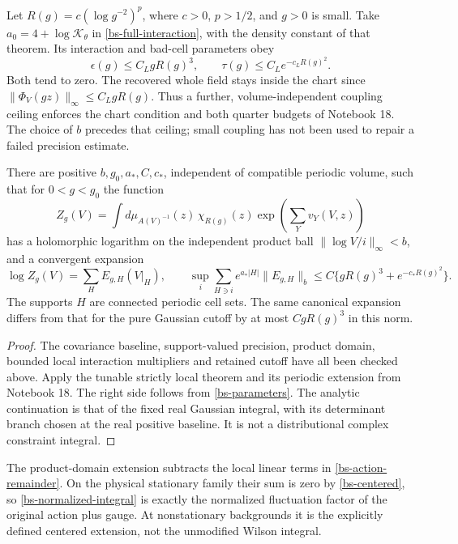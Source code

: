 Let $R(g)=c(\log g^{-2})^p$, where $c>0$, $p>1/2$,
and $g>0$ is small. Take $a_0=4+\log\mathcal K_\theta$
in \eqref{bs-full-interaction}, with the density constant of
that theorem. Its interaction and bad-cell parameters obey
\begin{equation}\label{bs-parameters}
 \epsilon(g)\le C_LgR(g)^3,\qquad
 \tau(g)\le C_L e^{-c_LR(g)^2}.
\end{equation}
Both tend to zero. The recovered whole field stays inside
the chart since $\|\Phi_V(gz)\|_\infty\le C_LgR(g)$.
Thus a further, volume-independent coupling ceiling enforces
the chart condition and both quarter budgets of Notebook 18.
The choice of $b$ precedes that ceiling; small coupling has
not been used to repair a failed precision estimate.

\begin{theorem}
\label{bs-theorem}
There are positive $b,g_0,a_*,C,c_*$, independent of compatible
periodic volume, such that for $0<g<g_0$ the function
\begin{equation}\label{bs-normalized-integral}
 Z_g(V)=\int d\mu_{A(V)^{-1}}(z)\,
                  \chi_{R(g)}(z)\exp\!\left(\sum_Y v_Y(V,z)\right)
\end{equation}
has a holomorphic logarithm on the independent product ball
$\|\log V/i\|_\infty<b$, and a convergent expansion
\begin{equation}\label{bs-local-log}
 \log Z_g(V)=\sum_H E_{g,H}(V|_H),\qquad
 \sup_i\sum_{H\ni i}e^{a_*|H|}\|E_{g,H}\|_b
 \le C\{gR(g)^3+e^{-c_*R(g)^2}\}.
\end{equation}
The supports $H$ are connected periodic cell sets. The same
canonical expansion differs from that for the pure Gaussian
cutoff by at most $CgR(g)^3$ in this norm.
\end{theorem}
\begin{proof}
The covariance baseline, support-valued precision, product
domain, bounded local interaction multipliers and retained
cutoff have all been checked above. Apply the tunable strictly
local theorem and its periodic extension from Notebook 18.
The right side follows from \eqref{bs-parameters}. The
analytic continuation is that of the fixed real Gaussian
integral, with its determinant branch chosen at the real
positive baseline. It is not a distributional complex
constraint integral.
\end{proof}

The product-domain extension subtracts the local linear
terms in \eqref{bs-action-remainder}. On the physical
stationary family their sum is zero by \eqref{bs-centered},
so \eqref{bs-normalized-integral} is exactly the normalized
fluctuation factor of the original action plus gauge.
At nonstationary backgrounds it is the explicitly defined
centered extension, not the unmodified Wilson integral.

